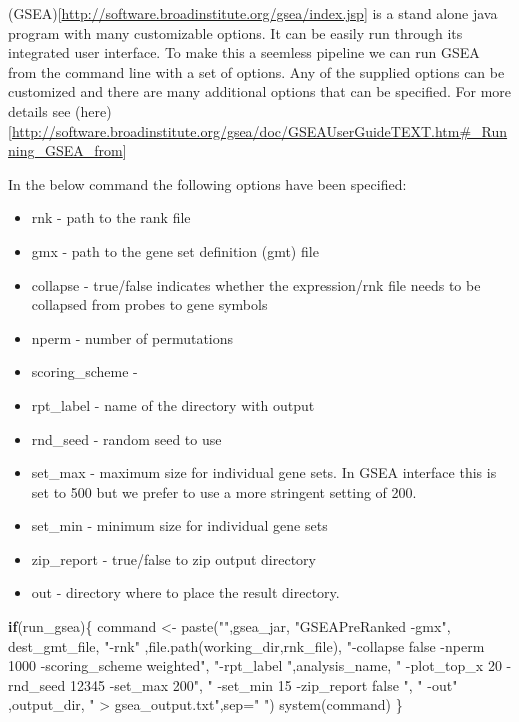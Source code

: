 \documentclass[
]{book}
\newenvironment{Shaded}{\begin{snugshade}}{\end{snugshade}}
\newcommand{\AttributeTok}[1]{\textcolor[rgb]{0.77,0.63,0.00}{#1}}
\newcommand{\ControlFlowTok}[1]{\textcolor[rgb]{0.13,0.29,0.53}{\textbf{#1}}}
\newcommand{\FunctionTok}[1]{\textcolor[rgb]{0.00,0.00,0.00}{#1}}
\newcommand{\NormalTok}[1]{#1}
\newcommand{\OtherTok}[1]{\textcolor[rgb]{0.56,0.35,0.01}{#1}}
\newcommand{\StringTok}[1]{\textcolor[rgb]{0.31,0.60,0.02}{#1}}
\providecommand{\tightlist}{%
  \setlength{\itemsep}{0pt}\setlength{\parskip}{0pt}}
\begin{document}
(GSEA){[}\url{http://software.broadinstitute.org/gsea/index.jsp}{]} is a stand alone java program with many customizable options. It can be easily run through its integrated user interface. To make this a seemless pipeline we can run GSEA from the command line with a set of options. Any of the supplied options can be customized and there are many additional options that can be specified. For more details see (here){[}\url{http://software.broadinstitute.org/gsea/doc/GSEAUserGuideTEXT.htm\#_Running_GSEA_from}{]}

In the below command the following options have been specified:

\begin{itemize}
\tightlist
\item
  rnk - path to the rank file
\item
  gmx - path to the gene set definition (gmt) file
\item
  collapse - true/false indicates whether the expression/rnk file needs to be collapsed from probes to gene symbols
\item
  nperm - number of permutations
\item
  scoring\_scheme -
\item
  rpt\_label - name of the directory with output
\item
  rnd\_seed - random seed to use
\item
  set\_max - maximum size for individual gene sets. In GSEA interface this is set to 500 but we prefer to use a more stringent setting of 200.
\item
  set\_min - minimum size for individual gene sets
\item
  zip\_report - true/false to zip output directory
\item
  out - directory where to place the result directory.
\end{itemize}

\begin{Shaded}
\begin{Highlighting}[]
\ControlFlowTok{if}\NormalTok{(run\_gsea)\{}
\NormalTok{  command }\OtherTok{\textless{}{-}} \FunctionTok{paste}\NormalTok{(}\StringTok{""}\NormalTok{,gsea\_jar,  }
                   \StringTok{"GSEAPreRanked {-}gmx"}\NormalTok{, dest\_gmt\_file, }
                   \StringTok{"{-}rnk"}\NormalTok{ ,}\FunctionTok{file.path}\NormalTok{(working\_dir,rnk\_file), }
                   \StringTok{"{-}collapse false {-}nperm 1000 {-}scoring\_scheme weighted"}\NormalTok{, }
                   \StringTok{"{-}rpt\_label "}\NormalTok{,analysis\_name,}
                   \StringTok{"  {-}plot\_top\_x 20 {-}rnd\_seed 12345  {-}set\_max 200"}\NormalTok{,  }
                   \StringTok{" {-}set\_min 15 {-}zip\_report false "}\NormalTok{,}
                   \StringTok{" {-}out"}\NormalTok{ ,output\_dir, }
                   \StringTok{" \textgreater{} gsea\_output.txt"}\NormalTok{,}\AttributeTok{sep=}\StringTok{" "}\NormalTok{)}
  \FunctionTok{system}\NormalTok{(command)}
\NormalTok{\}}
\end{Highlighting}
\end{Shaded}
\end{document}
